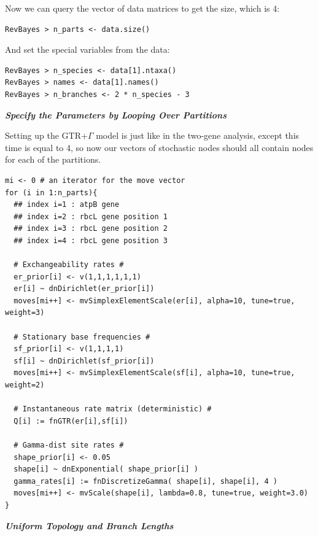 Now we can query the vector of data matrices to get the size, which is 4:
{\tt \begin{snugshade*}
\begin{lstlisting}
RevBayes > n_parts <- data.size()
\end{lstlisting}
\end{snugshade*}}

And set the special variables from the data:
{\tt \begin{snugshade*}
\begin{lstlisting}
RevBayes > n_species <- data[1].ntaxa()
RevBayes > names <- data[1].names()
RevBayes > n_branches <- 2 * n_species - 3
\end{lstlisting}
\end{snugshade*}}




\textbf{\textit{Specify the Parameters by Looping Over Partitions}}

Setting up the GTR+$\Gamma$ model is just like in the two-gene analysis, except this time  is equal to 4, so now our vectors of stochastic nodes should all contain nodes for each of the partitions.
{\tt \small \begin{snugshade*}
\begin{lstlisting}
mi <- 0 # an iterator for the move vector
for (i in 1:n_parts){
  ## index i=1 : atpB gene
  ## index i=2 : rbcL gene position 1
  ## index i=3 : rbcL gene position 2
  ## index i=4 : rbcL gene position 3

  # Exchangeability rates #
  er_prior[i] <- v(1,1,1,1,1,1)
  er[i] ~ dnDirichlet(er_prior[i])
  moves[mi++] <- mvSimplexElementScale(er[i], alpha=10, tune=true, weight=3) 

  # Stationary base frequencies #
  sf_prior[i] <- v(1,1,1,1)
  sf[i] ~ dnDirichlet(sf_prior[i])
  moves[mi++] <- mvSimplexElementScale(sf[i], alpha=10, tune=true, weight=2) 

  # Instantaneous rate matrix (deterministic) #
  Q[i] := fnGTR(er[i],sf[i]) 

  # Gamma-dist site rates #
  shape_prior[i] <- 0.05 
  shape[i] ~ dnExponential( shape_prior[i] )
  gamma_rates[i] := fnDiscretizeGamma( shape[i], shape[i], 4 )
  moves[mi++] <- mvScale(shape[i], lambda=0.8, tune=true, weight=3.0)
}
\end{lstlisting}
\end{snugshade*}}


\textbf{\textit{Uniform Topology and Branch Lengths}}

